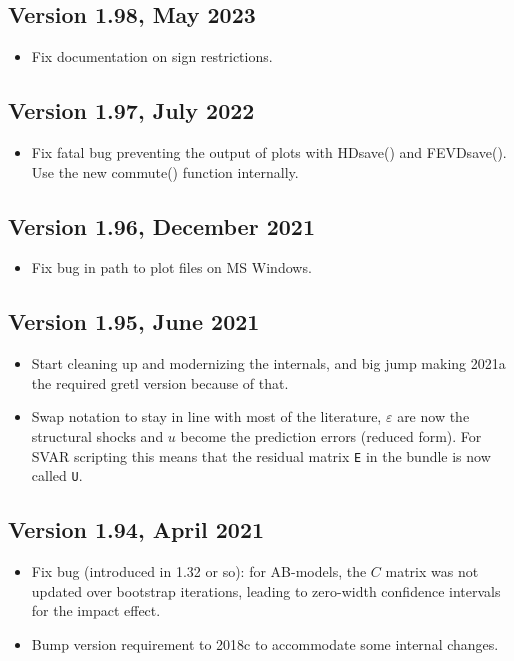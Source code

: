 \documentclass[a4paper,10pt]{article}
\newcounter{script}[section]
\begin{document}
\subsection*{Version 1.98, May 2023}
\begin{itemize}
\item Fix documentation on sign restrictions.
\end{itemize}

\subsection*{Version 1.97, July 2022}
\begin{itemize}
\item Fix fatal bug preventing the output of plots with HDsave() and
  FEVDsave(). Use the new commute() function internally.
\end{itemize}

\subsection*{Version 1.96, December 2021}
\begin{itemize}
\item Fix bug in path to plot files on MS Windows.
\end{itemize}

\subsection*{Version 1.95, June 2021}
\begin{itemize}
\item Start cleaning up and modernizing the internals, and big jump
  making 2021a the required gretl version because of that.
\item Swap notation to stay in line with most of the literature, $\varepsilon$ are now the structural shocks and $u$ become the prediction errors (reduced form). For SVAR scripting
this means that the residual matrix \texttt{E} in the bundle is now called \texttt{U}.  
\end{itemize}

\subsection*{Version 1.94, April 2021}
\begin{itemize}
\item Fix bug (introduced in 1.32 or so): for AB-models, the $C$ matrix was
  not updated over bootstrap iterations, leading to zero-width confidence 
  intervals for the impact effect.
\item Bump version requirement to 2018c to accommodate some internal changes.
\end{itemize}
\end{document}
